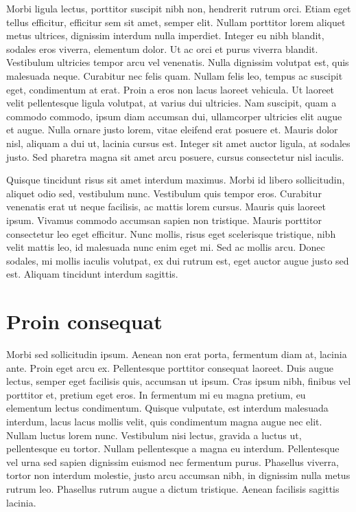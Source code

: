 Morbi ligula lectus, porttitor suscipit nibh non, hendrerit rutrum orci. Etiam eget tellus efficitur, efficitur sem sit amet, semper elit. Nullam porttitor lorem aliquet metus ultrices, dignissim interdum nulla imperdiet. Integer eu nibh blandit, sodales eros viverra, elementum dolor. Ut ac orci et purus viverra blandit. Vestibulum ultricies tempor arcu vel venenatis. Nulla dignissim volutpat est, quis malesuada neque. Curabitur nec felis quam. Nullam felis leo, tempus ac suscipit eget, condimentum at erat. Proin a eros non lacus laoreet vehicula. Ut laoreet velit pellentesque ligula volutpat, at varius dui ultricies. Nam suscipit, quam a commodo commodo, ipsum diam accumsan dui, ullamcorper ultricies elit augue et augue. Nulla ornare justo lorem, vitae eleifend erat posuere et. Mauris dolor nisl, aliquam a dui ut, lacinia cursus est. Integer sit amet auctor ligula, at sodales justo. Sed pharetra magna sit amet arcu posuere, cursus consectetur nisl iaculis.

Quisque tincidunt risus sit amet interdum maximus. Morbi id libero sollicitudin, aliquet odio sed, vestibulum nunc. Vestibulum quis tempor eros. Curabitur venenatis erat ut neque facilisis, ac mattis lorem cursus. Mauris quis laoreet ipsum. Vivamus commodo accumsan sapien non tristique. Mauris porttitor consectetur leo eget efficitur. Nunc mollis, risus eget scelerisque tristique, nibh velit mattis leo, id malesuada nunc enim eget mi. Sed ac mollis arcu. Donec sodales, mi mollis iaculis volutpat, ex dui rutrum est, eget auctor augue justo sed est. Aliquam tincidunt interdum sagittis.

\section{Proin consequat}
Morbi sed sollicitudin ipsum. Aenean non erat porta, fermentum diam at, lacinia ante. Proin eget arcu ex. Pellentesque porttitor consequat laoreet. Duis augue lectus, semper eget facilisis quis, accumsan ut ipsum. Cras ipsum nibh, finibus vel porttitor et, pretium eget eros. In fermentum mi eu magna pretium, eu elementum lectus condimentum. Quisque vulputate, est interdum malesuada interdum, lacus lacus mollis velit, quis condimentum magna augue nec elit. Nullam luctus lorem nunc. Vestibulum nisi lectus, gravida a luctus ut, pellentesque eu tortor. Nullam pellentesque a magna eu interdum. Pellentesque vel urna sed sapien dignissim euismod nec fermentum purus. Phasellus viverra, tortor non interdum molestie, justo arcu accumsan nibh, in dignissim nulla metus rutrum leo. Phasellus rutrum augue a dictum tristique. Aenean facilisis sagittis lacinia.

